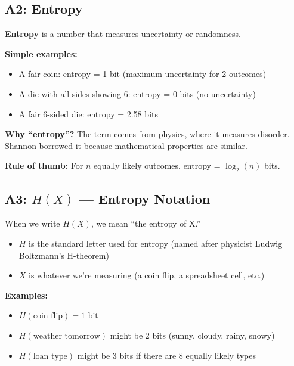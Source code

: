\documentclass[11pt,a4paper]{article}
\begin{document}
\subsection*{A2: Entropy}
\label{A2}

\textbf{Entropy} is a number that measures uncertainty or randomness.

\textbf{Simple examples:}
\begin{itemize}
    \item A fair coin: entropy = 1 bit (maximum uncertainty for 2 outcomes)
    \item A die with all sides showing 6: entropy = 0 bits (no uncertainty)
    \item A fair 6-sided die: entropy = 2.58 bits
\end{itemize}

\textbf{Why ``entropy''?} The term comes from physics, where it measures disorder. Shannon borrowed it because mathematical properties are similar.

\textbf{Rule of thumb:} For $n$ equally likely outcomes, entropy = $\log_2(n)$ bits.

\subsection*{A3: $H(X)$ --- Entropy Notation}
\label{A3}

When we write $H(X)$, we mean ``the entropy of X.''

\begin{itemize}
    \item $H$ is the standard letter used for entropy (named after physicist Ludwig Boltzmann's H-theorem)
    \item $X$ is whatever we're measuring (a coin flip, a spreadsheet cell, etc.)
\end{itemize}

\textbf{Examples:}
\begin{itemize}
    \item $H(\text{coin flip}) = 1$ bit
    \item $H(\text{weather tomorrow})$ might be 2 bits (sunny, cloudy, rainy, snowy)
    \item $H(\text{loan type})$ might be 3 bits if there are 8 equally likely types
\end{itemize}
\end{document}
